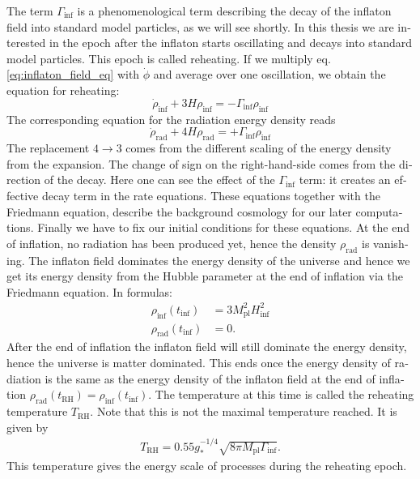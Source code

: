 \documentclass[master,       %
               twoside,        %
               BCOR10mm,       %
               english,ngerman, %
               ]{GAUBM}
\begin{document}
\begin{otherlanguage}{english}
The term $\Gamma_\mathrm{inf}$ is a phenomenological term describing the decay of the inflaton field into standard model particles, as we will see shortly. In this thesis we are interested in the epoch after the inflaton starts oscillating and decays into standard model particles. This epoch is called reheating.
If we multiply eq. \eqref{eq:inflaton_field_eq} with $\dot{\phi}$ and average over one oscillation, we obtain
the equation for reheating:
\begin{equation}
	\label{eq:cont_eq_inf}
	\boxed{
	\dot{\rho}_\mathrm{inf} + 3 H \rho_\mathrm{inf} = - \Gamma_\mathrm{inf} \rho_\mathrm{inf}
	}
\end{equation}
The corresponding equation for the radiation energy density reads
\begin{equation}
	\label{eq:cont_eq_rad}
	\boxed{
	\dot{\rho}_\mathrm{rad} + 4 H \rho_\mathrm{rad} = + \Gamma_\mathrm{inf} \rho_\mathrm{inf}
	}
\end{equation}
The replacement $4 \to 3$ comes from the different scaling of the energy density from the expansion. The change of sign on the right-hand-side comes from the direction of the decay. Here one can see the effect of the $\Gamma_{\mathrm{inf}}$ term: it creates an effective decay term in the rate equations.
These equations together with the Friedmann equation, describe the background cosmology for our later computations.
Finally we have to fix our initial conditions for these equations.
At the end of inflation, no radiation has been produced yet, hence the density $\rho_\mathrm{rad}$ is vanishing.
The inflaton field dominates the energy density of the universe and hence we get its energy density from the Hubble parameter at the end of inflation via the Friedmann equation.
In formulas:
\begin{align}
	\rho_\mathrm{inf}(t_\mathrm{inf}) &= 3 M_\mathrm{pl}^2 H_\mathrm{inf}^2 \nonumber \\
	\rho_\mathrm{rad}(t_\mathrm{inf}) &= 0.
\end{align}
After the end of inflation the inflaton field will still dominate the energy density, hence the universe is matter dominated. This ends once the energy density of radiation is the same as the energy density of the inflaton field at the end of inflation $\rho_\mathrm{rad}(t_\mathrm{RH}) = \rho_\mathrm{inf}(t_\mathrm{inf})$.
The temperature at this time is called the reheating temperature $T_\mathrm{RH}$.
Note that this is not the maximal temperature reached.
It is given by \cite[eq. 8.34]{the_early_universe_kolb_and_turner}
\begin{align}
	T_\mathrm{RH} = 0.55 g_*^{-1/4} \sqrt{8 \pi M_\mathrm{pl}  \Gamma_\mathrm{inf}}.
\end{align}
This temperature gives the energy scale of processes during the reheating epoch.



\end{otherlanguage}
\end{document}
